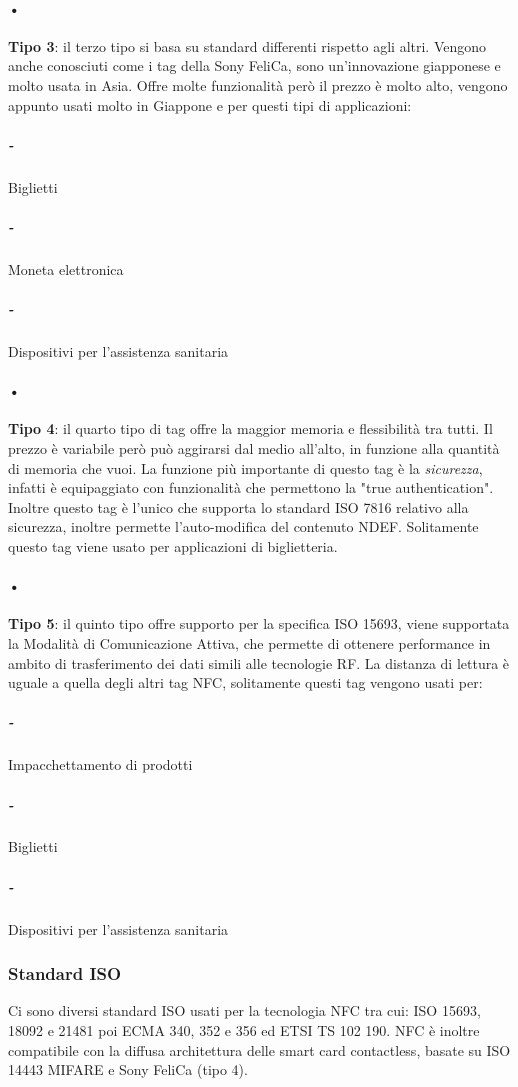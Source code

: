 \paragraph{•}\textbf{Tipo 3}: il terzo tipo si basa su standard differenti rispetto agli altri. Vengono anche conosciuti come i tag della Sony FeliCa, sono un'innovazione giapponese e molto usata in Asia. Offre molte funzionalità però il prezzo è molto alto, vengono appunto usati molto in Giappone e per questi tipi di applicazioni:
\subparagraph{-} Biglietti
\subparagraph{-} Moneta elettronica
\subparagraph{-} Dispositivi per l'assistenza sanitaria

\paragraph{•}\textbf{Tipo 4}: il quarto tipo di tag offre la maggior memoria e flessibilità tra tutti. Il prezzo è variabile però può aggirarsi dal medio all'alto, in funzione alla quantità di memoria che vuoi. La funzione più importante di questo tag è la \textit{sicurezza}, infatti è equipaggiato con funzionalità che permettono la "true authentication". Inoltre questo tag è l'unico che supporta lo standard ISO 7816 relativo alla sicurezza, inoltre permette l'auto-modifica del contenuto NDEF. Solitamente questo tag viene usato per applicazioni di biglietteria.

\paragraph{•}\textbf{Tipo 5}: il quinto tipo offre supporto per la specifica ISO 15693, viene supportata la Modalità di Comunicazione Attiva, che permette di ottenere performance in ambito di trasferimento dei dati simili alle tecnologie RF. La distanza di lettura è uguale a quella degli altri tag NFC, solitamente questi tag vengono usati per:
\subparagraph{-} Impacchettamento di prodotti
\subparagraph{-} Biglietti
\subparagraph{-} Dispositivi per l'assistenza sanitaria

\subsubsection{Standard ISO}
\hspace{\parindent}Ci sono diversi standard ISO usati per la tecnologia NFC tra cui: ISO 15693, 18092 e 21481 poi ECMA 340, 352 e 356 ed ETSI TS 102 190. NFC è inoltre compatibile con la diffusa architettura delle smart card contactless, basate su ISO 14443 MIFARE e Sony FeliCa (tipo 4).


